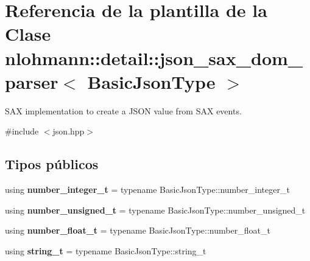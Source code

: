 \hypertarget{classnlohmann_1_1detail_1_1json__sax__dom__parser}{}\section{Referencia de la plantilla de la Clase nlohmann\+:\+:detail\+:\+:json\+\_\+sax\+\_\+dom\+\_\+parser$<$ Basic\+Json\+Type $>$}
\label{classnlohmann_1_1detail_1_1json__sax__dom__parser}


S\+AX implementation to create a J\+S\+ON value from S\+AX events.  




{\ttfamily \#include $<$json.\+hpp$>$}

\subsection*{Tipos públicos}
\begin{DoxyCompactItemize}
\item 
\mbox{\label{classnlohmann_1_1detail_1_1json__sax__dom__parser_a3d5cd67d179aa7422ce90e54984a441e}} 
using {\bfseries number\+\_\+integer\+\_\+t} = typename Basic\+Json\+Type\+::number\+\_\+integer\+\_\+t
\item 
\mbox{\label{classnlohmann_1_1detail_1_1json__sax__dom__parser_a90f19b272530a479db81db11be2ea15c}} 
using {\bfseries number\+\_\+unsigned\+\_\+t} = typename Basic\+Json\+Type\+::number\+\_\+unsigned\+\_\+t
\item 
\mbox{\label{classnlohmann_1_1detail_1_1json__sax__dom__parser_ad8da3aad0147b18b3cb76868480300fe}} 
using {\bfseries number\+\_\+float\+\_\+t} = typename Basic\+Json\+Type\+::number\+\_\+float\+\_\+t
\item 
\mbox{\label{classnlohmann_1_1detail_1_1json__sax__dom__parser_afd4d961ab2a6b01cbe6e840f7fb90cdc}} 
using {\bfseries string\+\_\+t} = typename Basic\+Json\+Type\+::string\+\_\+t
\end{DoxyCompactItemize}
